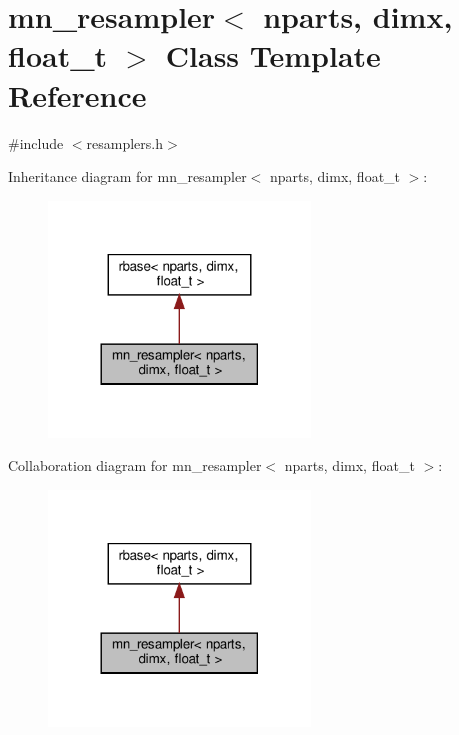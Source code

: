 \hypertarget{classmn__resampler}{}\section{mn\+\_\+resampler$<$ nparts, dimx, float\+\_\+t $>$ Class Template Reference}
\label{classmn__resampler}


{\ttfamily \#include $<$resamplers.\+h$>$}



Inheritance diagram for mn\+\_\+resampler$<$ nparts, dimx, float\+\_\+t $>$\+:\nopagebreak
\begin{figure}[H]
\begin{center}
\leavevmode
\includegraphics[width=197pt]{classmn__resampler__inherit__graph}
\end{center}
\end{figure}


Collaboration diagram for mn\+\_\+resampler$<$ nparts, dimx, float\+\_\+t $>$\+:\nopagebreak
\begin{figure}[H]
\begin{center}
\leavevmode
\includegraphics[width=197pt]{classmn__resampler__coll__graph}
\end{center}
\end{figure}
